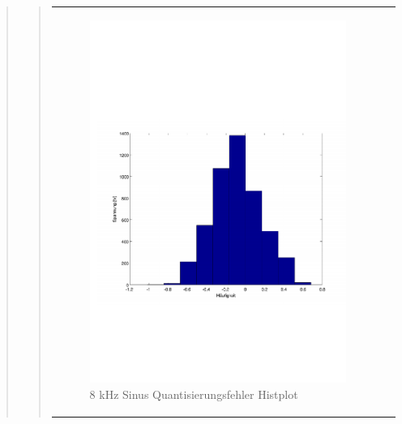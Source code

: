 \begin{quote}
\begin{quote}
\begin{center}
\begin{tabular}{ll}
                \begin{minipage}{0.6\textwidth}
                    \begin{figure}[H]
                        \includegraphics[scale=0.5, trim = 16mm 70mm 16mm 85mm, clip]
                                        {Bilder/8kHz_sin_Quant_Hist}
                        \caption{8 kHz Sinus Quantisierungsfehler Histplot}
                        \label{fig:8kHz_sin_Hist}
                    \end{figure}
                \end{minipage}
            
            \end{tabular}
        \end{center}
        
        \vspace{2em}
	   	

\end{quote}
\end{quote}

